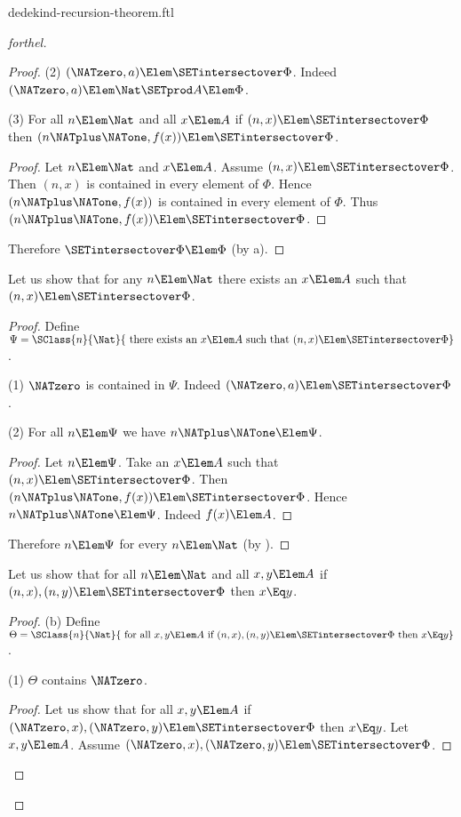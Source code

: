 \documentclass{stex}
\begin{document}
\begin{smodule}{dedekind-recursion-theorem.ftl}
\begin{proof}[forthel]
\begin{proof}
    (2) $(\NATzero, a) \Elem \SETintersectover \Phi$.
    Indeed $(\NATzero, a) \Elem \Nat \SETprod A \Elem \Phi$.

    (3) For all $n \Elem \Nat$ and all $x \Elem A$ if $(n, x) \Elem
    \SETintersectover \Phi$ then $(n \NATplus \NATone, f(x)) \Elem \SETintersectover \Phi$.
    \begin{proof}
      Let $n \Elem \Nat$ and $x \Elem A$.
      Assume $(n, x) \Elem \SETintersectover \Phi$.
      Then $(n, x)$ is contained in every element of $\Phi$.
      Hence $(n \NATplus \NATone, f(x))$ is contained in every element of $\Phi$.
      Thus $(n \NATplus \NATone, f(x)) \Elem \SETintersectover \Phi$.
    \end{proof}

    Therefore $\SETintersectover \Phi \Elem \Phi$ (by a).
  \end{proof}

  Let us show that for any $n \Elem \Nat$ there exists an $x \Elem A$ such
  that $(n, x) \Elem \SETintersectover \Phi$.
  \begin{proof}
    Define $\Psi = \SClass{n}{\Nat}{\text{ there exists an }x \Elem A\text{ such
    that }(n, x) \Elem \SETintersectover \Phi}$.

    (1) $\NATzero$ is contained in $\Psi$.
    Indeed $(\NATzero, a) \Elem \SETintersectover \Phi$.

    (2) For all $n \Elem \Psi$ we have $n \NATplus \NATone \Elem \Psi$.
    \begin{proof}
      Let $n \Elem \Psi$.
      Take an $x \Elem A$ such that $(n, x) \Elem \SETintersectover \Phi$.
      Then $(n \NATplus \NATone, f(x)) \Elem \SETintersectover \Phi$.
      Hence $n \NATplus \NATone \Elem \Psi$.
      Indeed $f(x) \Elem A$.
    \end{proof}

    Therefore $n \Elem \Psi$ for every $n \Elem \Nat$ (by ).
  \end{proof}

  Let us show that for all $n \Elem \Nat$ and all $x, y \Elem A$ if
  $(n, x), (n, y) \Elem \SETintersectover \Phi$ then $x \Eq y$.
  \begin{proof}
    (b) Define $\Theta = \SClass{n}{\Nat}{\text{ for all }x, y \Elem A\text{ if }
    (n, x), (n, y) \Elem \SETintersectover \Phi\text{ then }x \Eq y}$.

    (1) $\Theta$ contains $\NATzero$.
    \begin{proof}
      Let us show that for all $x, y \Elem A$ if $(\NATzero, x), (\NATzero, y) \Elem
      \SETintersectover \Phi$ then $x \Eq y$.
        Let $x, y \Elem A$.
        Assume $(\NATzero, x), (\NATzero, y) \Elem \SETintersectover \Phi$.


\end{proof}
\end{proof}
\end{proof}
\end{smodule}
\end{document}
